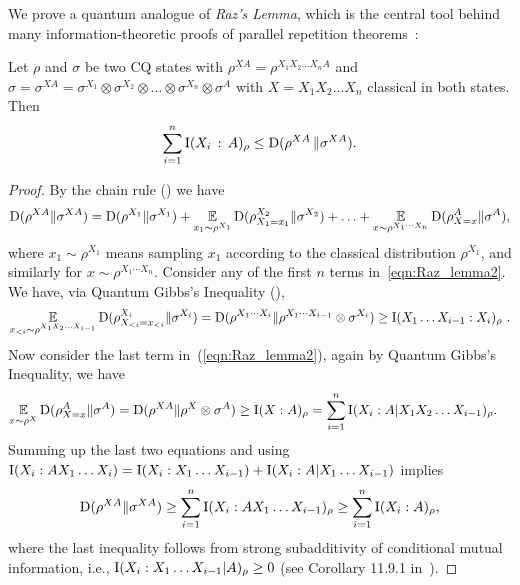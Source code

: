 We prove a quantum analogue of \emph{Raz's Lemma}, which is the central tool behind many information-theoretic proofs of parallel repetition theorems~\cite{raz1998parallel, Hol09,barak2009strong}: 
\begin{lemma}
\label{lem:quantum_raz}
Let $\rho$ and $\sigma$ be two CQ states with  $\rho^{XA}= \rho^{X_1 X_2 \ldots X_n A}$ and $\sigma= \sigma^{XA}= \sigma^{X_1}\otimes \sigma^{X_2}\otimes \ldots \otimes \sigma^{X_n} \otimes \sigma^A$ with $X=X_1 X_2 \ldots X_n$ classical in both states. Then
\begin{equation}\label{eqn:Raz_lemma1} \sum_{i=1}^n \mathrm{I}(X_i \, :\, A)_\rho \leq \mathrm{D}(\rho^{XA} \, \| \sigma^{XA}). \end{equation}

\end{lemma}
\begin{proof}
By the chain rule () we have 
\begin{equation}\label{eqn:Raz_lemma2}
\mathrm{D}(\rho^{XA} \| \sigma^{XA})= \mathrm{D}(\rho^{X_1} \| \sigma^{X_1}) + \operatorname*{\mathbb{E}}_{x_1 \sim \rho^{X_1}} \mathrm{D}(\rho^{X_2}_{X_1=x_1}\| \sigma^{X_2}) + \ldots+ \operatorname*{\mathbb{E}}_{x \sim \rho^{X_1 \cdots X_n}} \mathrm{D}(\rho^{A}_{X=x} \| \sigma^{A}),
\end{equation}
where $x_1 \sim \rho^{X_1}$ means sampling $x_1$ according to the classical distribution $\rho^{X_1}$, and similarly for $x \sim \rho^{X_1 \cdots X_n}$. Consider any of the first $n$ terms in~\eqref{eqn:Raz_lemma2}. We have, via Quantum Gibbs's Inequality (), 
\begin{equation*}
\operatorname*{\mathbb{E}}_{x_{<i}\sim \rho^{X_1X_2\ldots X_{i-1}}} \mathrm{D}(\rho^{X_i}_{X_{< i}= x_{<i}} \| \sigma^{X_i}) = \mathrm{D}(\rho^{X_1 \cdots X_i} \|\rho^{X_1 \cdots X_{i-1}} \otimes \sigma^{X_i}) \geq  \mathrm{I}(X_1\ldots X_{i-1} : X_i)_\rho~.
\end{equation*}
Now consider the last term in~(\ref{eqn:Raz_lemma2}), again by Quantum Gibbs's Inequality, we have
\begin{align}
\operatorname*{\mathbb{E}}_{x\sim \rho^X} \mathrm{D}(\rho^{A}_{X=x} \|\sigma^{A}) &= \mathrm{D}(\rho^{XA} \| \rho^X \otimes \sigma^A) \geq \mathrm{I}(X:A)_\rho = \sum_{i=1}^n \mathrm{I}(X_i : A| X_1 X_2 \ldots X_{i-1})_\rho. \notag
\end{align}
Summing up the last two equations and using $\mathrm{I}(X_i:A X_1\ldots X_i)= \mathrm{I}(X_i:X_1\ldots X_{i-1})+ \mathrm{I}(X_i:A|X_1\ldots X_{i-1})$ implies
\[ \mathrm{D}(\rho^{X A} \| \sigma^{XA})\geq \sum_{i=1}^n \mathrm{I}(X_i: A X_1 \ldots X_{i-1})_\rho \geq \sum_{i=1}^n \mathrm{I}(X_i:A)_\rho,
\]
where the last inequality follows from strong subadditivity of conditional mutual information, i.e., $\mathrm{I}(X_i:X_1\ldots X_{i-1}|A)_\rho\geq 0$ (see Corollary 11.9.1 in~\cite{wilde2013quantum}). 
\end{proof}

